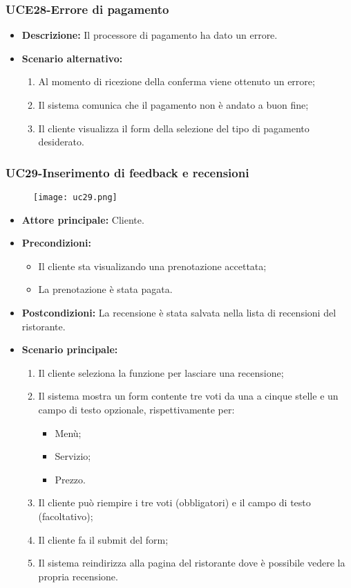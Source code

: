 \subsubsection{UCE28-Errore di pagamento}
\begin{itemize}
\item \textbf{Descrizione: } Il processore di pagamento ha dato un errore.
\item \textbf{Scenario alternativo:}
\begin{enumerate}
    \item Al momento di ricezione della conferma viene ottenuto un errore;
    \item Il sistema comunica che il pagamento non è andato a buon fine;
    \item Il cliente visualizza il form della selezione del tipo di pagamento desiderato.
\end{enumerate}
\end{itemize}

\subsubsection{UC29-Inserimento di feedback e recensioni}
\begin{figure}[h] \texttt{[image: uc29.png]} \end{figure}
\begin{itemize}
\item \textbf{Attore principale:} Cliente.
\item \textbf{Precondizioni:}
  \begin{itemize}
    \item Il cliente sta visualizando una prenotazione accettata;
    \item La prenotazione è stata pagata.
  \end{itemize}
\item \textbf{Postcondizioni:} La recensione è stata salvata nella lista di recensioni del ristorante.
\item \textbf{Scenario principale:}
\begin{enumerate}
    \item Il cliente seleziona la funzione per lasciare una recensione;
    \item Il sistema mostra un form contente tre voti da una a cinque stelle e un campo di testo opzionale, rispettivamente per:
  \begin{itemize}
    \item Menù;
    \item Servizio;
    \item Prezzo.
  \end{itemize}
    \item Il cliente può riempire i tre voti (obbligatori) e il campo di testo (facoltativo);
    \item Il cliente fa il submit del form;
    \item Il sistema reindirizza alla pagina del ristorante dove è possibile vedere la propria recensione.
\end{enumerate}
\end{itemize}

